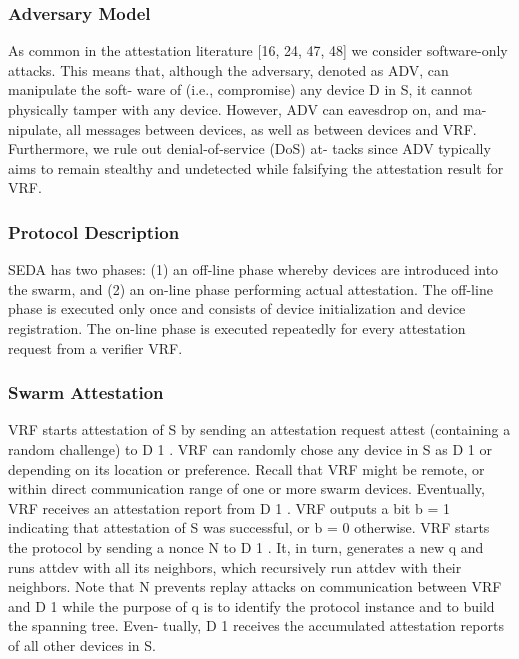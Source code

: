 \documentclass{article}
\begin{document}
\subsubsection{Adversary Model}

As common in the attestation literature [16,
24, 47, 48] we consider software-only attacks. This means that,
although the adversary, denoted as ADV, can manipulate the soft-
ware of (i.e., compromise) any device D in S, it cannot physically
tamper with any device. However, ADV can eavesdrop on, and ma-
nipulate, all messages between devices, as well as between devices
and VRF. Furthermore, we rule out denial-of-service (DoS) at-
tacks since ADV typically aims to remain stealthy and undetected
while falsifying the attestation result for VRF.

\subsubsection{Protocol Description}

SEDA has two phases: (1) an off-line phase whereby devices
are introduced into the swarm, and (2) an on-line phase performing
actual attestation. The off-line phase is executed only once and
consists of device initialization and device registration. The on-line
phase is executed repeatedly for every attestation request from a
verifier VRF.

\subsubsection{Swarm Attestation}

VRF starts attestation of S by sending an
attestation request attest (containing a random challenge) to D 1 .
VRF can randomly chose any device in S as D 1 or depending on
its location or preference. Recall that VRF might be remote, or
within direct communication range of one or more swarm devices.
Eventually, VRF receives an attestation report from D 1 . VRF
outputs a bit b = 1 indicating that attestation of S was successful,
or b = 0 otherwise. VRF starts
the protocol by sending a nonce N to D 1 . It, in turn, generates a
new q and runs attdev with all its neighbors, which recursively run
attdev with their neighbors. Note that N prevents replay attacks on
communication between VRF and D 1 while the purpose of q is to
identify the protocol instance and to build the spanning tree. Even-
tually, D 1 receives the accumulated attestation reports of all other
devices in S.
\end{document}
